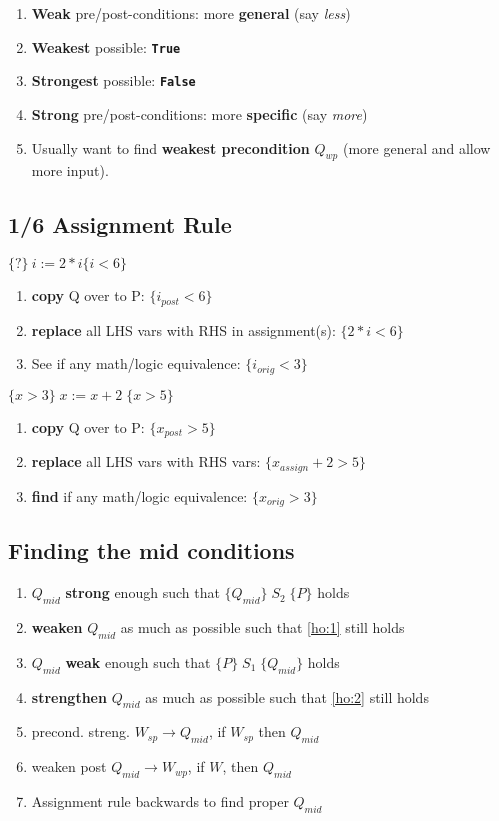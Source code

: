 {\footnotesize
\begin{enumerate}
\item \textbf{Weak} pre/post-conditions: more \textbf{general} (say \emph{less})
\item \textbf{Weakest} possible: \textbf{\texttt{True}}
\item \textbf{Strongest} possible: \textbf{\texttt{False}}
\item \textbf{Strong} pre/post-conditions: more \textbf{specific} (say \emph{more})
\item Usually want to find \textbf{weakest precondition} $Q_{wp}$ (more general and allow more input).
\end{enumerate}
\subsection*{1/6 Assignment Rule}
\begin{minipage}{0.45\linewidth}
  {\centering \(\{?\}\ i := 2 * i \{i < 6\}\)}
\begin{enumerate}
\item \textbf{copy} Q over to P: \(\{i_{post} < 6\}\)
\item \textbf{replace} all LHS vars with RHS in assignment(s): \(\{2 * i < 6\}\)
\item See if any math/logic equivalence: \(\{i_{orig} < 3\}\)
\end{enumerate}
\end{minipage}
\begin{minipage}{0.45\linewidth}
  {\centering \(\{x > 3\}\;x:=x+2\;\{x>5\}\)}
\begin{enumerate}
\item \textbf{copy} Q over to P: \(\{x_{post} > 5\}\)
\item \textbf{replace} all LHS vars with RHS vars: \(\{x_{assign}+2 > 5\}\)
\item \textbf{find} if any math/logic equivalence: \(\{x_{orig} > 3\}\)
\end{enumerate}
\end{minipage}
\subsection*{Finding the mid conditions}
\begin{enumerate}
\item\label{ho:1} $Q_{mid}$ \textbf{strong} enough such that $\{Q_{mid}\}\;S_{2}\;\{P\}$ holds
\item \textbf{weaken} $Q_{mid}$ as much as possible such that \ref{ho:1} still holds
\item\label{ho:2} $Q_{mid}$ \textbf{weak} enough such that $\{P\}\;S_{1}\;\{Q_{mid}\}$ holds
\item\textbf{strengthen} $Q_{mid}$ as much as possible such that \ref{ho:2} still holds
\item[] precond. streng. $W_{sp} \rightarrow Q_{mid}$, if $W_{sp}$ then $Q_{mid}$
\item[] weaken post $Q_{mid} \rightarrow W_{wp}$, if $W$, then $Q_{mid}$
\item Assignment rule backwards to find proper $Q_{mid}$
\end{enumerate}

}
